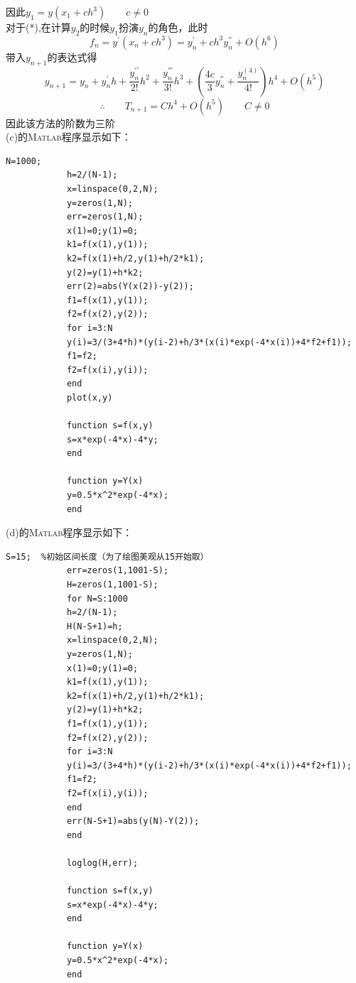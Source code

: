 \documentclass[12pt,a4paper,utf8]{ctexart}
\begin{document}
\begin{enumerate}
		因此$y_{1}=y(x_{1}+ch^{3})\qquad c\neq 0$\\
		对于(*),在计算$y_{2}$的时候$y_{1}$扮演$y_{n}$的角色，此时$$
		f_{n}=y^{'}(x_{n}+ch^{3})=y^{'}_{n}+ch^{3}y^{''}_{n}+O(h^{6})$$
		带入$y_{n+1}$的表达式得$$
		y_{n+1}=y_{n}+y_{n}^{\prime} h+\frac{y_{n}^{\prime \prime}}{2 !} h^{2}+\frac{y^{'''}_{n}}{3!}h^{3}+(\frac{4c}{3}y^{''}_{n}+\frac{y^{(4)}_{n}}{4!})h^{
		4}+O(h^{5})$$ $$
		\therefore\qquad T_{n+1}=Ch^{4}+O(h^{5})\qquad C\neq 0$$ 
		因此该方法的阶数为三阶\\
		(c)的\textsc{Matlab}程序显示如下：
		\begin{lstlisting}[breaklines,frame=single]
			N=1000;
			h=2/(N-1);
			x=linspace(0,2,N);
			y=zeros(1,N);
			err=zeros(1,N);
			x(1)=0;y(1)=0;
			k1=f(x(1),y(1));
			k2=f(x(1)+h/2,y(1)+h/2*k1);
			y(2)=y(1)+h*k2;
			err(2)=abs(Y(x(2))-y(2));
			f1=f(x(1),y(1));
			f2=f(x(2),y(2));
			for i=3:N 
			y(i)=3/(3+4*h)*(y(i-2)+h/3*(x(i)*exp(-4*x(i))+4*f2+f1));
			f1=f2;
			f2=f(x(i),y(i));
			end
			plot(x,y)
			
			function s=f(x,y)
			s=x*exp(-4*x)-4*y;
			end
			
			function y=Y(x)
			y=0.5*x^2*exp(-4*x);
			end
		\end{lstlisting}
		(d)的\textsc{Matlab}程序显示如下：
		\begin{lstlisting}[breaklines,frame=single]
			S=15;  %初始区间长度（为了绘图美观从15开始取）
			err=zeros(1,1001-S);
			H=zeros(1,1001-S);
			for N=S:1000
			h=2/(N-1);
			H(N-S+1)=h;
			x=linspace(0,2,N);
			y=zeros(1,N);
			x(1)=0;y(1)=0;
			k1=f(x(1),y(1));
			k2=f(x(1)+h/2,y(1)+h/2*k1);
			y(2)=y(1)+h*k2;
			f1=f(x(1),y(1));
			f2=f(x(2),y(2));
			for i=3:N 
			y(i)=3/(3+4*h)*(y(i-2)+h/3*(x(i)*exp(-4*x(i))+4*f2+f1));
			f1=f2;
			f2=f(x(i),y(i));
			end
			err(N-S+1)=abs(y(N)-Y(2));
			end

			loglog(H,err);
			
			function s=f(x,y)
			s=x*exp(-4*x)-4*y;
			end
			
			function y=Y(x)
			y=0.5*x^2*exp(-4*x);
			end
		\end{lstlisting}
	\end{enumerate}
\end{document}
